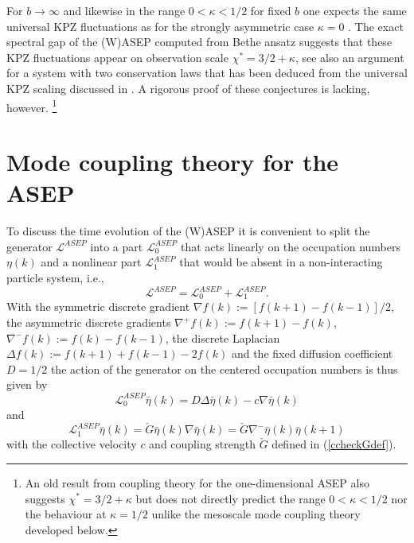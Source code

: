 \documentclass[12pt]{article}
\begin{document}
For $b\to \infty$ and likewise in the range $0 < \kappa <1/2$ 
for fixed $b$ one expects the same universal KPZ fluctuations as for 
the strongly asymmetric case $\kappa=0$ \cite{Amir11}. 
The exact spectral gap of the (W)ASEP computed from Bethe ansatz
\cite{Kim95} suggests that these KPZ fluctuations appear on observation scale $\chi^\ast = 3/2+\kappa$, see also an argument for
a system with two conservation laws that has been deduced 
\cite{Cannarx23} from the universal KPZ scaling discussed in 
\cite{Quas23}. 
A rigorous proof of these conjectures is lacking, however.
\footnote{An old result from coupling theory for the one-dimensional ASEP \cite{vanB85} also suggests $\chi^\ast = 3/2+\kappa$
but does not directly predict the range $0 < \kappa <1/2$
nor the behaviour at $\kappa = 1/2$
unlike the mesoscale mode coupling theory developed below.}

\section{Mode coupling theory for the ASEP}

To discuss the time evolution of the (W)ASEP it is convenient to
split the generator $\mathcal{L}^{ASEP}$ into a part $\mathcal{L}^{ASEP}_0$ that acts 
linearly on the occupation numbers $\eta(k)$ and a nonlinear
part $\mathcal{L}^{ASEP}_1$ that would be absent in a non-interacting particle system, i.e.,  
\begin{equation}
\mathcal{L}^{ASEP} = \mathcal{L}^{ASEP}_0 +
\mathcal{L}^{ASEP}_1.
\label{geneta}
\end{equation}
With the symmetric discrete gradient 
$\nabla f(k) := [f(k+1)-f(k-1)]/2$, the asymmetric discrete gradients
$\nabla^+ f(k) := f(k+1)-f(k)$, $\nabla^- f(k) := f(k)-f(k-1)$, the
discrete Laplacian $\Delta f(k) := f(k+1)+f(k-1) - 2 f(k)$ and
the fixed diffusion coefficient $D=1/2$ the action of the generator
on the centered occupation numbers is thus given by \cite{Ligg99}
\begin{equation}
\mathcal{L}^{ASEP}_0 \bar{\eta}(k) = D \Delta \bar{\eta}(k) 
- c \nabla \bar{\eta}(k) 
\label{genASEPlin}
\end{equation}
and
\begin{equation}
\mathcal{L}^{ASEP}_1 \bar{\eta}(k) = \check{G} \bar{\eta}(k) 
\nabla \bar{\eta}(k) = \check{G} \nabla^- \bar{\eta}(k) \bar{\eta}(k+1)
\label{genASEPnl}
\end{equation}
with the collective velocity $c$ and coupling strength $\check{G}$
defined in (\ref{ccheckGdef}).
\end{document}
